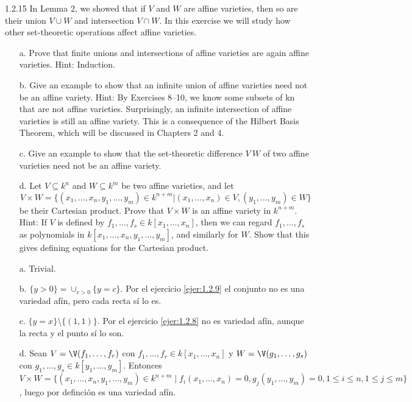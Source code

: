 \documentclass[twoside]{article}
\begin{document}
\begin{ejercicio}{1.2.15}
In Lemma 2, we showed that if $V$ and $W$ are affine varieties, then so are their union $V∪W$
and intersection $V ∩W$. In this exercise we will study how other set-theoretic operations
affect affine varieties.
\begin{itemize}
\item[a.] Prove that finite unions and intersections of affine varieties are again affine varieties.
Hint: Induction.
\item[b.] Give an example to show that an infinite union of affine varieties need not be an
affine variety. Hint: By Exercises 8–10, we know some subsets of kn that are not
affine varieties. Surprisingly, an infinite intersection of affine varieties is still an affine
variety. This is a consequence of the Hilbert Basis Theorem, which will be discussed
in Chapters 2 and 4.
\item[c.] Give an example to show that the set-theoretic difference $V \ W$ of two affine varieties
need not be an affine variety.
\item[d.] Let $V ⊆ k^n$ and $W ⊆ k^m$ be two affine varieties, and let
$$V × W = \{(x_1,\dots , x_n, y_1,\dots , y_m) ∈ k^{n+m} | (x_1, . . . , x_n) ∈ V, (y_1, . . . , y_m) ∈ W\}$$
be their Cartesian product. Prove that $V ×W$ is an affine variety in $k^{n+m}$. Hint: If $V$ is
defined by $f_1,\dots , f_s ∈ k[x_1,\dots , x_n]$, then we can regard $f_1,\dots, f_s$ as polynomials in
$k[x_1,\dots , x_n, y_1,\dots, y_m]$, and similarly for $W$. Show that this gives defining equations
for the Cartesian product.
\end{itemize}
\end{ejercicio}
\begin{solucion}
\begin{itemize}
\item[a.] Trivial.
\item[b.] $\{y>0\}=\cup_{c>0}\{y=c\}$. Por el ejercicio \ref{ejer:1.2.9} el conjunto no es una variedad afín, pero cada recta sí lo es. 
\item[c.] $\{y=x\}\setminus \{(1,1)\}$. Por el ejercicio \ref{ejer:1.2.8} no es variedad afín, aunque la recta y el punto sí lo son.
\item[d.] Sean $V=\V(f_1,\dots, f_r)$ con $f_1,\dots, f_r\in k[x_1,\dots, x_n]$ y $W=\V(g_1,\dots, g_s)$ con $g_1,\dots, g_s\in k[y_1,\dots, y_m]$. Entonces $V\times W=\{(x_1,\dots, x_n,y_1,\dots, y_m)\in k^{n+m}\mid f_i(x_1,\dots, x_n)=0, g_j(y_1,\dots, y_m)=0, 1\leq i\leq n, 1\leq j\leq m\}$, luego por definción es una variedad afín.
\end{itemize}
\end{solucion}
\end{document}
